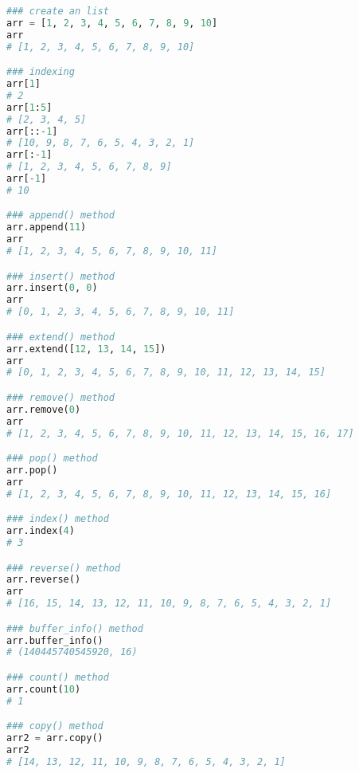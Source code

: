 \begin{lstlisting}[language=Python]
### create an list
arr = [1, 2, 3, 4, 5, 6, 7, 8, 9, 10]
arr
# [1, 2, 3, 4, 5, 6, 7, 8, 9, 10]

### indexing
arr[1]
# 2
arr[1:5]
# [2, 3, 4, 5]
arr[::-1]
# [10, 9, 8, 7, 6, 5, 4, 3, 2, 1]
arr[:-1]
# [1, 2, 3, 4, 5, 6, 7, 8, 9]
arr[-1]
# 10

### append() method
arr.append(11)
arr
# [1, 2, 3, 4, 5, 6, 7, 8, 9, 10, 11]

### insert() method
arr.insert(0, 0)
arr
# [0, 1, 2, 3, 4, 5, 6, 7, 8, 9, 10, 11]

### extend() method
arr.extend([12, 13, 14, 15])
arr
# [0, 1, 2, 3, 4, 5, 6, 7, 8, 9, 10, 11, 12, 13, 14, 15]

### remove() method
arr.remove(0)
arr
# [1, 2, 3, 4, 5, 6, 7, 8, 9, 10, 11, 12, 13, 14, 15, 16, 17]

### pop() method
arr.pop()
arr
# [1, 2, 3, 4, 5, 6, 7, 8, 9, 10, 11, 12, 13, 14, 15, 16]

### index() method
arr.index(4)
# 3

### reverse() method
arr.reverse()
arr
# [16, 15, 14, 13, 12, 11, 10, 9, 8, 7, 6, 5, 4, 3, 2, 1]

### buffer_info() method
arr.buffer_info()
# (140445740545920, 16)

### count() method
arr.count(10)
# 1

### copy() method
arr2 = arr.copy()
arr2
# [14, 13, 12, 11, 10, 9, 8, 7, 6, 5, 4, 3, 2, 1]
\end{lstlisting}

\newpage